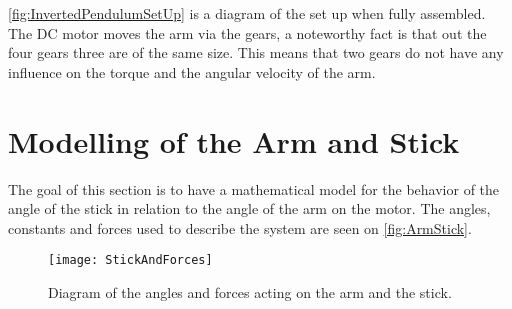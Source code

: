 \autoref{fig:InvertedPendulumSetUp} is a diagram of the set up when fully assembled. The DC motor moves the arm via the gears, a noteworthy fact is that out the four gears three are of the same size. This means that two gears do not have any influence on the torque and the angular velocity of the arm.




\section{Modelling of the Arm and Stick}\label{sec:StickArm}

\graphicspath{{figures/Preanalysis&Requirement/PendulumModeling/}}
The goal of this section is to have a mathematical model for the behavior of the angle of the stick in relation to the angle of the arm on the motor. The angles, constants and forces used to describe the system are seen on \autoref{fig:ArmStick}.
\begin{figure}[htbp]
	\centering
	\texttt{[image: StickAndForces]}
	\caption{Diagram of the angles and forces acting on the arm and the stick.}
	\label{fig:ArmStick}
\end{figure}

